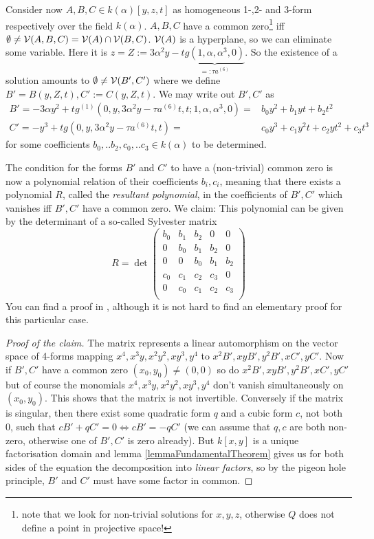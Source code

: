 Consider now $A,B,C \in k(\alpha)[y,z,t]$ as homogeneous 1-,2- and 3-form respectively over the field $k(\alpha)$.
$A,B,C$ have a common zero\footnote{note that we look for non-trivial solutions for $x,y,z$, otherwise $Q$ does not define a point in projective space!} iff $\emptyset \neq \operatorname{\mathcal V}(A,B,C) = \operatorname{\mathcal V}(A) \cap \operatorname{\mathcal V}(B,C)$.
$\operatorname{\mathcal V}(A)$ is a hyperplane, so we can eliminate some variable. Here it is $z = Z := 3\alpha^2 y - t\underset{=: \tau a^{(6)}}{\underbrace{g(1,\alpha,\alpha^3,0)}}$.
So the existence of a solution amounts to $\emptyset \neq \operatorname{\mathcal V}(B',C')$ where we define $B' = B(y,Z,t), C' := C(y,Z,t)$.
We may write out $B',C'$ as
\begin{align}
B' = -3\alpha y^2 + tg^{(1)}(0,y,3\alpha^2y - \tau a^{(6)}t,t;1,\alpha,\alpha^3,0) =& b_0y^2 + b_1yt + b_2 t^2 \\
C' = -y^3 + tg(0,y,3\alpha^2y-\tau a^{(6)}t,t) =& c_0y^3 + c_1y^2t + c_2 yt^2 + c_3t^3
\end{align}
for some coefficients $b_0,..b_2,c_0,..c_3 \in k(\alpha)$ to be determined.

The condition for the forms $B'$ and $C'$ to have a (non-trivial) common zero is now a polynomial relation of their coefficients $b_i,c_i$, meaning that there exists a polynomial $R$, called the \emph{resultant polynomial}, in the coefficients of $B',C'$ which vanishes iff $B',C'$ have a common zero.
We claim: This polynomial can be given by the determinant of a so-called Sylvester matrix
\begin{equation}
R =
\det\begin{pmatrix}
b_0 & b_1 & b_2 & 0 & 0 \\
0 & b_0 & b_1 & b_2 & 0 \\
0 & 0 & b_0 & b_1 & b_2 \\
c_0 & c_1 & c_2 & c_3 & 0 \\
0 & c_0 & c_1 & c_2 & c_3 \\
\end{pmatrix}
\end{equation}
You can find a proof in \cite[theorem 4.2.3]{brieskorn2012plane}, although it is not hard to find an elementary proof for this particular case.
\begin{proof}[Proof of the claim]
The matrix represents a linear automorphism on the vector space of 4-forms mapping $x^4,x^3y,x^2y^2,xy^3,y^4$ to $x^2B',xyB',y^2B',xC',yC'$.
Now if $B',C'$ have a common zero $(x_0,y_0) \neq (0,0)$ so do $x^2B',xyB',y^2B',xC',yC'$ but of course the monomials $x^4,x^3y,x^2y^2,xy^3,y^4$ don't vanish simultaneously on $(x_0,y_0)$. This shows that the matrix is not invertible.
Conversely if the matrix is singular, then there exist some quadratic form $q$ and a cubic form $c$, not both 0, such that $cB' + qC' = 0 \Leftrightarrow cB' = -qC'$ (we can assume that $q,c$ are both non-zero, otherwise one of $B',C'$ is zero already).
But $k[x,y]$ is a unique factorisation domain and lemma \ref{lemmaFundamentalTheorem} gives us for both sides of the equation the decomposition into \emph{linear factors}, so by the pigeon hole principle, $B'$ and $C'$ must have some factor in common.
\end{proof}

